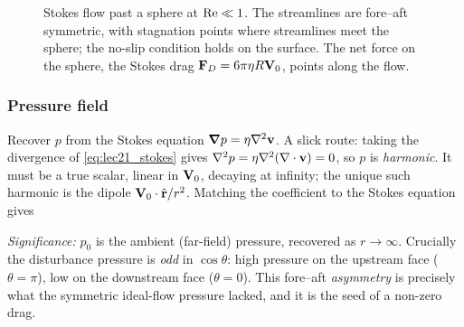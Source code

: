 \documentclass[../main.tex]{subfiles}
\begin{document}
\begin{figure}[h]
\centering
{}
\caption{Stokes flow past a sphere at $\mathrm{Re}\ll1$. The streamlines are fore--aft symmetric, with stagnation points where streamlines meet the sphere; the no-slip condition holds on the surface. The net force on the sphere, the Stokes drag $\mathbf{F}_D=6\pi\eta R\mathbf{V}_0$, points along the flow.}
\label{fig:lec21_stokes}
\end{figure}

\subsubsection*{Pressure field}
Recover $p$ from the Stokes equation $\grad p=\eta\nabla^2\mathbf{v}$. A slick route: taking the divergence of \eqref{eq:lec21_stokes} gives $\nabla^2 p=\eta\nabla^2(\nabla \cdot\mathbf{v})=0$, so $p$ is \emph{harmonic}. It must be a true scalar, linear in $\mathbf{V}_0$, decaying at infinity; the unique such harmonic is the dipole $\mathbf{V}_0\cdot\hat{\mathbf{r}}/r^2$. Matching the coefficient to the Stokes equation gives

\textit{Significance:} $p_0$ is the ambient (far-field) pressure, recovered as $r\to\infty$. Crucially the disturbance pressure is \emph{odd} in $\cos\theta$: high pressure on the upstream face ($\theta=\pi$), low on the downstream face ($\theta=0$). This fore--aft \emph{asymmetry} is precisely what the symmetric ideal-flow pressure lacked, and it is the seed of a non-zero drag.
\end{document}
